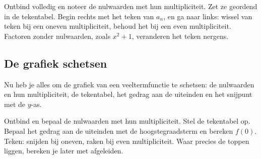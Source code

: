 \begin{werkwijze}
Ontbind volledig en noteer de nulwaarden met hun multipliciteit. Zet ze geordend in de tekentabel. Begin rechts met het teken van $a_n$, en ga naar links: wissel van teken bij een oneven multipliciteit, behoud het bij een even multipliciteit. Factoren zonder nulwaarden, zoals $x^2 + 1$, veranderen het teken nergens.
\end{werkwijze}

\begin{oefeningen}
\end{oefeningen}

\subsection{De grafiek schetsen}

Nu heb je alles om de grafiek van een veeltermfunctie te schetsen: de nulwaarden en hun multipliciteit, de tekentabel, het gedrag aan de uiteinden en het snijpunt met de $y$-as.


\begin{werkwijze}
Ontbind en bepaal de nulwaarden met hun multipliciteit. Stel de tekentabel op. Bepaal het gedrag aan de uiteinden met de hoogstegraadsterm en bereken $f(0)$. Teken: snijden bij oneven, raken bij even multipliciteit. Waar precies de toppen liggen, bereken je later met afgeleiden.
\end{werkwijze}

\begin{oefeningen}
\end{oefeningen}

